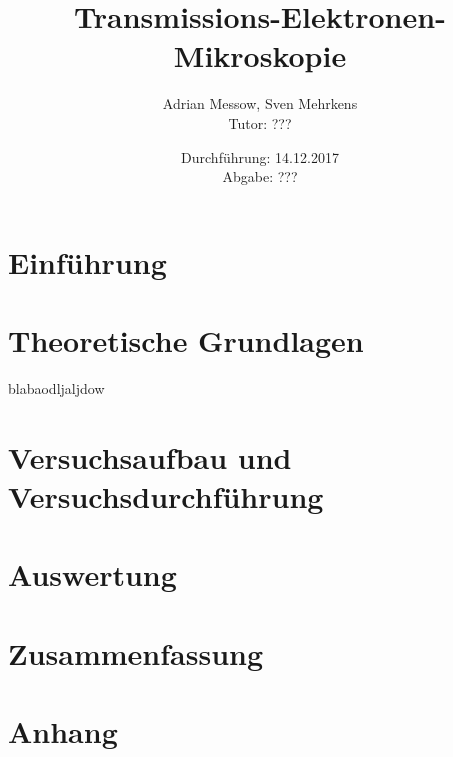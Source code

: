 \documentclass[a4paper,11pt,DIV=11]{scrartcl}
\title{Transmissions-Elektronen-Mikroskopie}
\author{Adrian Messow, Sven Mehrkens \\
Tutor: ???}
\date{Durchführung: 14.12.2017 \\ Abgabe: ??? }
\begin{document}
\maketitle
\section{Einführung}


\section{Theoretische Grundlagen}
blabaodljaljdow
	
\section{Versuchsaufbau und Versuchsdurchführung}

\section{Auswertung}

\section{Zusammenfassung}

\section*{Anhang}
\end{document}
